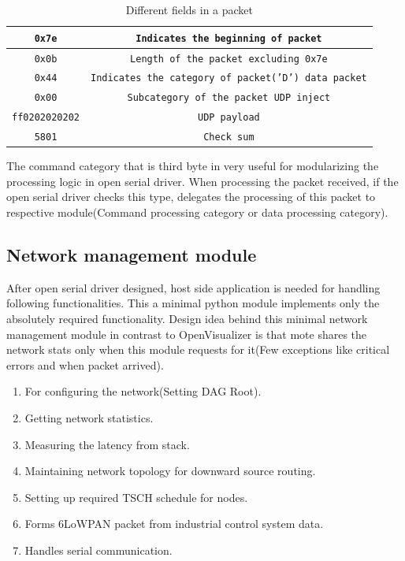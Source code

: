 \begin{table}[H]
	\renewcommand{\arraystretch}{1.3}
	\label{meas:Explanation}
	\centering
	\begin{tabular}{|c|c|}
		\hline
		\texttt{0x7e} & \texttt{Indicates the beginning of packet} \\
		\hline
  		\texttt{0x0b} & \texttt{Length of the packet excluding 0x7e} \\
  		\hline
  		\texttt{0x44} & \texttt{Indicates the category of packet('D') data packet} \\
  		\hline
  		\texttt{0x00} & \texttt{Subcategory of the packet UDP inject} \\
  		\hline
  		\texttt{ff}\texttt{02}\texttt{02}\texttt{02}\texttt{02}\texttt{02} & \texttt{UDP payload} \\
  		\hline
  		\texttt{5801} & \texttt{Check sum} \\
  		\hline
	\end{tabular}
	\caption{Different fields in a packet}
\end{table}



 The command category that is third byte in very useful for modularizing the processing logic in open serial driver. When processing the packet received, if the open serial driver checks this type, delegates the processing of this packet to respective module(Command processing category or data processing category).


\subsection{Network management module}
After open serial driver designed, host side application is needed for handling following functionalities. This a minimal python module implements only the absolutely required functionality. Design idea behind this minimal network management module in contrast to OpenVisualizer is that mote shares the network stats only when this module requests for it(Few exceptions like critical errors and when packet arrived).

\begin{enumerate}
	\item For configuring the network(Setting DAG Root).
    \item Getting network statistics.
	\item Measuring the latency from stack.
	\item Maintaining network topology for downward source routing.
	\item Setting up required TSCH schedule for nodes.
	\item Forms 6LoWPAN packet from industrial control system data.
	\item Handles serial communication.
\end{enumerate}

